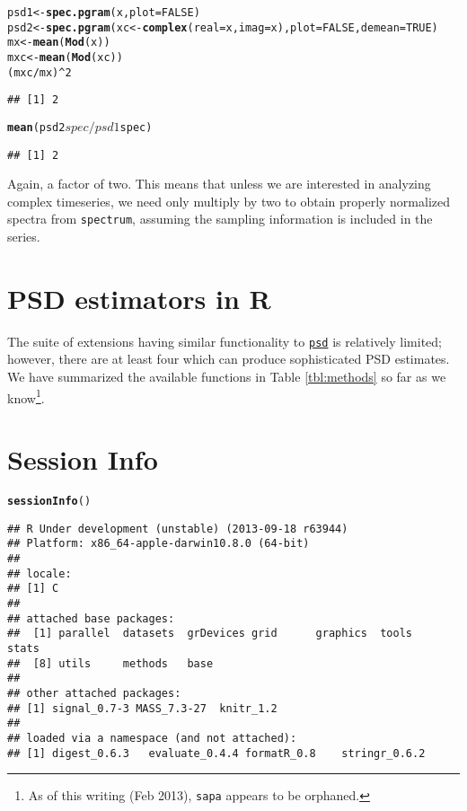 \documentclass[10pt]{article}\usepackage{graphicx, color}
\makeatletter
\newcommand{\hlfunctioncall}[1]{\textcolor[rgb]{0.501960784313725,0,0.329411764705882}{\textbf{#1}}}%
\newenvironment{kframe}{%
 \def\at@end@of@kframe{}%
 \ifinner\ifhmode%
  \def\at@end@of@kframe{\end{minipage}}%
  \begin{minipage}{\columnwidth}%
 \fi\fi%
 \def\FrameCommand##1{\hskip\@totalleftmargin \hskip-\fboxsep
 \colorbox{shadecolor}{##1}\hskip-\fboxsep
     \hskip-\linewidth \hskip-\@totalleftmargin \hskip\columnwidth}%
 \MakeFramed {\advance\hsize-\width
   \@totalleftmargin\z@ \linewidth\hsize
   \@setminipage}}%
 {\par\unskip\endMakeFramed%
 \at@end@of@kframe}
\newenvironment{knitrout}{}{} %
\newcommand{\Rcmd}[1]{\texttt{#1}}
\newcommand{\psd}[0]{\href{http://abarbour.github.com/psd/}{\color{blue}\Rcmd{psd}}}
\makeatother
\begin{document}
\begin{knitrout}
\color{fgcolor}\begin{kframe}
\begin{alltt}
psd1 <- \hlfunctioncall{spec.pgram}(x, plot = FALSE)
psd2 <- \hlfunctioncall{spec.pgram}(xc <- \hlfunctioncall{complex}(real = x, imag = x), plot = FALSE, demean = TRUE)
mx <- \hlfunctioncall{mean}(\hlfunctioncall{Mod}(x))
mxc <- \hlfunctioncall{mean}(\hlfunctioncall{Mod}(xc))
(mxc/mx)^2
\end{alltt}
\begin{verbatim}
## [1] 2
\end{verbatim}
\begin{alltt}
\hlfunctioncall{mean}(psd2$spec/psd1$spec)
\end{alltt}
\begin{verbatim}
## [1] 2
\end{verbatim}
\end{kframe}
\end{knitrout}


Again, a factor of two. 
This means that unless we are interested in analyzing complex
timeseries, we need only multiply by two 
to obtain properly normalized spectra
from \Rcmd{spectrum}, 
assuming the sampling information is included in the series.

\section{PSD estimators in R}
The suite of extensions having
similar functionality to \psd{}
is relatively limited; however, there are at least four which
can produce sophisticated PSD estimates.   We have
summarized the available functions in Table \ref{tbl:methods}
so far as we know\footnote{
As of this writing (Feb 2013), \Rcmd{sapa} appears to be orphaned.
}.



\pagebreak
\section*{Session Info}
\begin{knitrout}
\color{fgcolor}\begin{kframe}
\begin{alltt}
\hlfunctioncall{sessionInfo}()
\end{alltt}
\begin{verbatim}
## R Under development (unstable) (2013-09-18 r63944)
## Platform: x86_64-apple-darwin10.8.0 (64-bit)
## 
## locale:
## [1] C
## 
## attached base packages:
##  [1] parallel  datasets  grDevices grid      graphics  tools     stats    
##  [8] utils     methods   base     
## 
## other attached packages:
## [1] signal_0.7-3 MASS_7.3-27  knitr_1.2   
## 
## loaded via a namespace (and not attached):
## [1] digest_0.6.3   evaluate_0.4.4 formatR_0.8    stringr_0.6.2
\end{verbatim}
\end{kframe}
\end{knitrout}






\printindex
\end{document}
